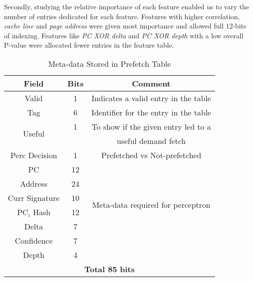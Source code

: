 Secondly, studying the relative importance of each feature enabled us
to vary the number of entries dedicated for each feature. Features
with higher correlation, \textit{cache line} and \textit{page address}
were given most importance and allowed full 12-bits of indexing.
Features like \textit{PC XOR delta} and \textit{PC XOR depth} with a
low overall P-value were allocated fewer entries in the feature table.


\begin{table}[ht]
    \centering
    \begin{adjustbox}{width=0.9\columnwidth}
    \begin{tabular}{|c|c|c|}
    \hline
        \textbf{Field} &
        \textbf{Bits} &
        \textbf{Comment} \\
    \hline
         Valid 		& 1  & Indicates a valid entry in the table\\
         Tag 		& 6  & Identifier for the entry in the table\\
         \multirow{2}{1cm}{Useful} 	& 1  & To show if the given entry led to a\\
                    	&    & useful demand fetch\\
         Perc Decision 	& 1  & Prefetched vs Not-prefetched \\
    \hline
        PC 		& 12 & \\
        Address 	& 24 & \\
        Curr Signature 	& 10 & \multirow{2}{4.8cm}{Meta-data required for perceptron}\\
	PC$_i$ Hash	& 12 & \multirow{2}{1.1cm}{training}\\
        Delta 		& 7  & \\
        Confidence 	& 7  & \\
	Depth		& 4  & \\
    \hline
        \multicolumn{3}{|c|}{\textbf{Total 85 bits}}\\
    \hline
    \end{tabular}
    \end{adjustbox}
    \caption{Meta-data Stored in Prefetch Table}
    \label{tab:PTable_metadata}
\end{table}


